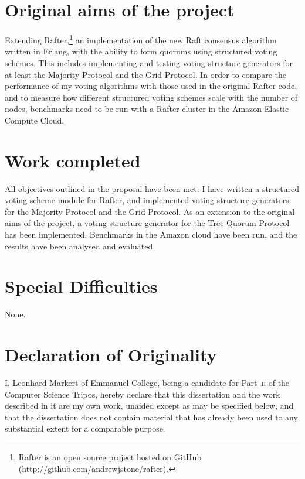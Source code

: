 \documentclass[12pt,chapterprefix=true,toc=bibliography,numbers=noendperiod,
               footnotes=multiple,twoside]{scrreprt}
\begin{document}
\section*{Original aims of the project}
\label{sc:original-aims}

Extending Rafter,\footnote{Rafter is an open source project hosted on GitHub (\url{http://github.com/andrewjstone/rafter}).} an implementation of the new Raft \autocite{raft} consensus algorithm written in Erlang, with the ability to form quorums using structured voting schemes. This includes implementing and testing voting structure generators for at least the Majority Protocol and the Grid Protocol. In order to compare the performance of my voting algorithms with those used in the original Rafter code, and to measure how different structured voting schemes scale with the number of nodes, benchmarks need to be run with a Rafter cluster in the Amazon Elastic Compute Cloud.

\section*{Work completed}
\label{sc:work-completed}

All objectives outlined in the proposal have been met: I have written a structured voting scheme module for Rafter, and implemented voting structure generators for the Majority Protocol and the Grid Protocol. As an extension to the original aims of the project, a voting structure generator for the Tree Quorum Protocol has been implemented. Benchmarks in the Amazon cloud have been run, and the results have been analysed and evaluated.

\section*{Special Difficulties}
\label{sc:special-difficulties}

None.

\newpage

\section*{Declaration of Originality}
\label{sc:declaration-of-originality}

I, Leonhard Markert of Emmanuel College, being a candidate for Part~\textsc{ii} of the Computer Science Tripos, hereby declare that this dissertation and the work described in it are my own work, unaided except as may be specified below, and that the dissertation does not contain material that has already been used to any substantial extent for a comparable purpose.
\end{document}
